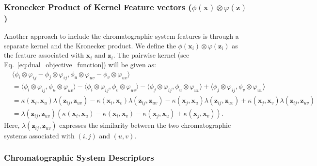 \documentclass[10p]{article}
\newcommand{\x}{\mathbf{x}}
\newcommand{\z}{\mathbf{z}}
\newcommand{\molkern}{\kappa}
\newcommand{\syskern}{\lambda}
\begin{document}
\subsubsection{Kronecker Product of Kernel Feature vectors ($\phi(\x)\otimes\varphi(\z)$)}

Another approach to include the chromatographic system features is through a separate kernel and the Kronecker product. We define the $\phi(\x_i)\otimes\varphi(\z_i)$ as the feature associated with $\x_i$ and $\z_i$. The pairwise kernel (see Eq.~\eqref{eq:dual_objective_function}) will be given as:
\begin{align}
    &\langle\phi_i\otimes\varphi_{ij}-\phi_j\otimes\varphi_{ij},\phi_u\otimes\varphi_{uv}-\phi_v\otimes\varphi_{uv}\rangle\\
        &=\langle\phi_i\otimes\varphi_{ij},\phi_u\otimes\varphi_{uv}\rangle
         -\langle\phi_i\otimes\varphi_{ij},\phi_v\otimes\varphi_{uv}\rangle
         -\langle\phi_j\otimes\varphi_{ij},\phi_u\otimes\varphi_{uv}\rangle
         +\langle\phi_j\otimes\varphi_{ij},\phi_v\otimes\varphi_{uv}\rangle\\
        &=\molkern(\x_i,\x_u)\syskern(\z_{ij},\z_{uv})
         -\molkern(\x_i,\x_v)\syskern(\z_{ij},\z_{uv})
         -\molkern(\x_j,\x_u)\syskern(\z_{ij},\z_{uv})
         +\molkern(\x_j,\x_v)\syskern(\z_{ij},\z_{uv})\\
        &=\syskern(\z_{ij},\z_{uv})(\molkern(\x_i,\x_u)-\molkern(\x_i,\x_v)-\molkern(\x_j,\x_u)+\molkern(\x_j,\x_v)).
\end{align}
Here, $\syskern(\z_{ij},\z_{uv})$ expresses the similarity between the two chromatographic systems associated with $(i,j)$ and $(u,v)$.

\subsubsection{Chromatographic System Descriptors}

 

\newpage
\printbibliography
\end{document}
